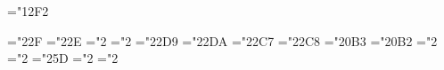 \mathchardef\smallint="12F2

\if@usecmmi
 \mathchardef\triangleleft="2\cmmi@2F
 \mathchardef\triangleright="2\cmmi@2E
\else
 \def\triangleleft{\@PSnofont\triangleleft}
 \def\triangleright{\@PSnofont\triangleright}
\fi
\if@usecmsy
 \mathchardef\bigtriangleup="2
 \mathchardef\bigtriangledown="2
\else
 \def\bigtriangleup{\@PSnofont\bigtriangleup}
 \def\bigtriangledown{\@PSnofont\bigtriangledown}
\fi
\mathchardef\wedge="22D9 \let\land=\wedge
\mathchardef\vee="22DA \let\lor=\vee
\mathchardef\cap="22C7
\mathchardef\cup="22C8
\mathchardef\ddagger="20B3
\mathchardef\dagger="20B2
\if@usecmsy
 \mathchardef\sqcap="2
 \mathchardef\sqcup="2
 \mathchardef\uplus="2\cmsy@5D
 \mathchardef\amalg="2
 \mathchardef\diamond="2
\else
 \def\sqcap{\@PSnofont\sqcap}
 \def\sqcup{\@PSnofont\sqcup}
